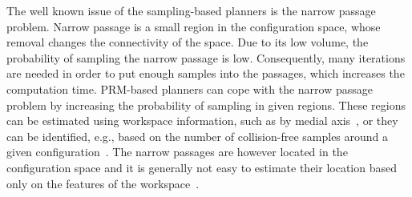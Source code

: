 \documentclass[usletter, 10pt, conference]{ieeeconf} %
\begin{document}
The well known issue of the sampling-based planners is the narrow passage problem.
Narrow passage is a small region in the configuration space, whose removal changes the connectivity of the space.
Due to its low volume, the probability of sampling the narrow passage is low.
Consequently, many iterations are needed in order to put enough samples into the passages, which increases the computation time.
PRM-based planners can cope with the narrow passage problem by increasing the probability of sampling in given regions.
These regions can be estimated using workspace information, such as by medial axis~\cite{amatoOBRRT,amato2002using,wilmarthMAPRM}, 
or they can be identified, e.g., based on the number of collision-free samples around a given configuration~\cite{overmarsGauss,hsuBridge}.
The narrow passages are however located in the configuration space and it is generally not easy to estimate their location
based only on the features of the workspace~\cite{hannaWIS}.
\end{document}
